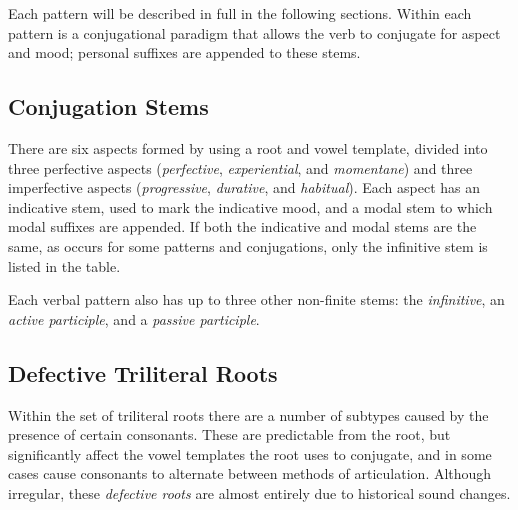 \documentclass[grammar]{subfiles}
\begin{document}
%        

%        


Each pattern will be described in full in the following sections.  Within each
pattern is a conjugational paradigm that allows the verb to conjugate for
aspect and mood; personal suffixes are appended to these stems.


\subsection{Conjugation Stems}
\label{sssec:vm_conjugation}

There are six aspects formed by using a root and vowel template, divided into
three perfective aspects (\emph{perfective}, \emph{experiential}, and
\emph{momentane}) and three imperfective aspects (\emph{progressive},
\emph{durative}, and \emph{habitual}).  Each aspect has an indicative stem,
used to mark the indicative mood, and a modal stem to which modal suffixes are
appended.  If both the indicative and modal stems are the same, as occurs for
some patterns and conjugations, only the infinitive stem is listed in the
table. 

Each verbal pattern also has up to three other non-finite stems: the
\emph{infinitive}, an \emph{active participle}, and a \emph{passive
participle}.  


\subsection{Defective Triliteral Roots}
\label{ssec:vm_defective_roots}

Within the set of triliteral roots there are a number of subtypes caused by the
presence of certain consonants.  These are predictable from the root, but
significantly affect the vowel templates the root uses to conjugate, and in
some cases cause consonants to alternate between methods of articulation.
Although irregular, these \emph{defective roots} are almost entirely due to
historical sound changes. 

\end{document}
